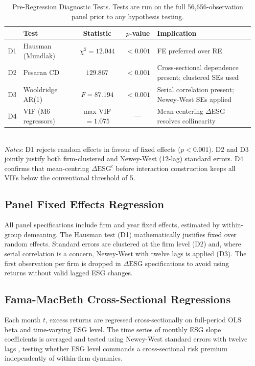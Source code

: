 \begin{table}[H]
  \centering
  \caption{Pre-Regression Diagnostic Tests. Tests are run on the full 56,656-observation panel prior to any hypothesis testing.}
  \label{tab:diagnostics}
  \small
  \begin{tabular}{l>{\raggedright\arraybackslash}p{3.0cm}cc>{\raggedright\arraybackslash}p{4.1cm}}
    \toprule
    & Test & Statistic & $p$-value & Implication \\
    \midrule
    D1 & Hausman (Mundlak)      & $\chi^2 = 12.044$ & $<0.001$ & FE preferred over RE \\
    D2 & Pesaran CD             & $129.867$         & $<0.001$ & Cross-sectional dependence present; clustered SEs used \\
    D3 & Wooldridge AR(1)       & $F = 87.194$      & $<0.001$ & Serial correlation present; Newey-West SEs applied \\
    D4 & VIF (M6 regressors)    & max VIF $= 1.075$ & ---      & Mean-centering $\Delta$ESG resolves collinearity \\
    \bottomrule
  \end{tabular}
  \smallskip\\
  \footnotesize \textit{Notes}: D1 rejects random effects in favour of fixed effects ($p<0.001$). D2 and D3 jointly justify both firm-clustered and Newey-West (12-lag) standard errors. D4 confirms that mean-centring $\Delta\mathrm{ESG}^c$ before interaction construction keeps all VIFs below the conventional threshold of 5.
\end{table}

\subsection{Panel Fixed Effects Regression}

All panel specifications include firm and year fixed effects, estimated by within-group demeaning. The Hausman test (D1) mathematically justifies fixed over random effects. Standard errors are clustered at the firm level (D2) and, where serial correlation is a concern, Newey-West with twelve lags is applied (D3). The first observation per firm is dropped in $\Delta\mathrm{ESG}$ specifications to avoid using returns without valid lagged ESG changes.

\subsection{Fama-MacBeth Cross-Sectional Regressions}

Each month $t$, excess returns are regressed cross-sectionally on full-period OLS beta and time-varying ESG level. The time series of monthly ESG slope coefficients is averaged and tested using Newey-West standard errors with twelve lags \citep{newey1987simple}, testing whether ESG level commands a cross-sectional risk premium independently of within-firm dynamics.

